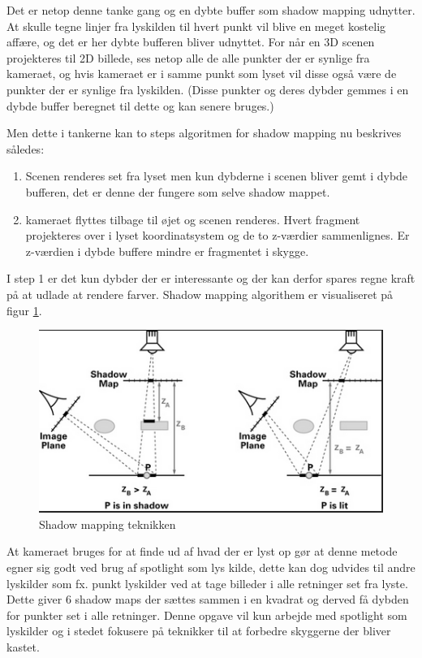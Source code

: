 \documentclass[11pt,a4paper]{article}
\begin{document}
Det er netop denne tanke gang og en dybte buffer som shadow mapping udnytter. At skulle tegne linjer fra lyskilden til hvert punkt vil blive en meget kostelig affære, og det er her dybte bufferen bliver udnyttet. For når en 3D scenen projekteres til 2D billede, ses netop alle de alle punkter der er synlige fra kameraet, og hvis kameraet er i samme punkt som lyset vil disse også være de punkter der er synlige fra lyskilden. (Disse punkter og deres dybder gemmes i en dybde buffer beregnet til dette og kan senere bruges.)

Men dette i tankerne kan to steps algoritmen for shadow mapping nu beskrives således:
\begin{enumerate}
\item Scenen renderes set fra lyset men kun dybderne i scenen bliver gemt i dybde bufferen, det er denne der fungere som selve shadow mappet.
\item kameraet flyttes tilbage til øjet og scenen renderes. Hvert fragment projekteres over i lyset koordinatsystem og de to z-værdier sammenlignes. Er z-værdien i dybde buffere mindre er fragmentet i skygge.
\end{enumerate}

I step 1 er det kun dybder der er interessante og der kan derfor spares regne kraft på at udlade at rendere farver. Shadow mapping algorithem er visualiseret på figur \ref{shadowmapdesc}.


\begin{figure}[ht!]
\centering
\includegraphics[width=140mm]{img/2.png}
\caption{Shadow mapping teknikken}
\label{shadowmapdesc}
\end{figure}


At kameraet bruges for at finde ud af hvad der er lyst op gør at denne metode egner sig godt ved brug af spotlight som lys kilde, dette kan dog udvides til andre lyskilder som fx. punkt lyskilder ved at tage billeder i alle retninger set fra lyste. Dette giver 6 shadow maps der sættes sammen i en kvadrat og derved få dybden for punkter set i alle retninger. Denne opgave vil kun arbejde med spotlight som lyskilder og i stedet fokusere på teknikker til at forbedre skyggerne der bliver kastet.  
\end{document}

